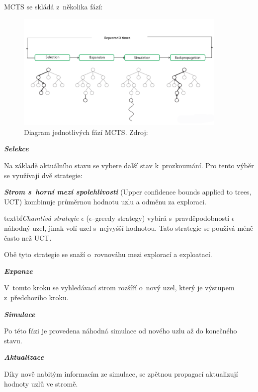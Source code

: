 MCTS se skládá z~několika fází:

\begin{figure}[H]
	\centering
	\includegraphics[width=0.9\textwidth]{obrazky-figures/mcts}
	\caption{Diagram jednotlivých fází MCTS.\@
  Zdroj:~\cite{mcts_geeksforgeeks}}\label{fig:mcts}
\end{figure}

\begin{myitemize}
  \item \textbf{\emph{Selekce}}

  Na základě aktuálního stavu se vybere další stav k~prozkoumání.
  Pro tento výběr se využívají dvě strategie:
  
  \textbf{\emph{Strom s~horní mezí spolehlivosti}} (Upper confidence bounds applied to trees, UCT) kombinuje průměrnou hodnotu uzlu a odměnu za exploraci.

  \label{epsilon_greedy}
  textbf{\emph{Chamtivá strategie $\epsilon$ }} ($\epsilon$--greedy strategy) vybírá s~pravděpodobností $\epsilon$ náhodný uzel, jinak volí uzel s~nejvyšší hodnotou.
  Tato strategie se používá méně často než UCT\@.

  Obě tyto strategie se snaží o~rovnováhu mezi explorací a exploatací.
  \item \textbf{\emph{Expanze}}

  V~tomto kroku se vyhledávací strom rozšíří o~nový uzel, který je výstupem z~předchozího kroku.

  \item \textbf{\emph{Simulace}}

  Po této fázi je provedena náhodná simulace od nového uzlu až do konečného stavu.

  \item \textbf{\emph{Aktualizace}}
  
  Díky nově nabitým informacím ze simulace, se zpětnou propagací aktualizují hodnoty uzlů ve stromě.
\end{myitemize}


